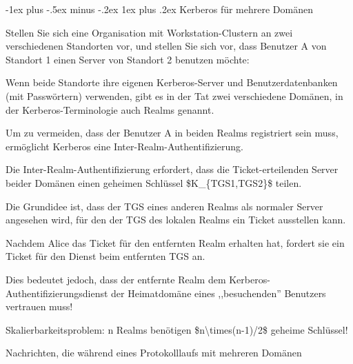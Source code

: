 \documentclass[a4paper]{article}
\makeatletter
\renewcommand{\subsubsection}{\@startsection{subsubsection}{3}{0mm}%
 {-1ex plus -.5ex minus -.2ex}%
 {1ex plus .2ex}%
 {\normalfont\small\bfseries}}
\makeatother
\begin{document}
\begin{multicols}{3}
      \subsubsection{Kerberos für mehrere
            Domänen}

      \begin{itemize*}
            \item Stellen Sie sich eine Organisation mit Workstation-Clustern an zwei
            verschiedenen Standorten vor, und stellen Sie sich vor, dass Benutzer
            A von Standort 1 einen Server von Standort 2 benutzen möchte:
            \begin{itemize*}
                  \item Wenn beide Standorte ihre eigenen Kerberos-Server und Benutzerdatenbanken (mit Passwörtern) verwenden, gibt es in der Tat zwei verschiedene Domänen, in der Kerberos-Terminologie auch Realms genannt.
                  \item Um zu vermeiden, dass der Benutzer A in beiden Realms registriert sein muss, ermöglicht Kerberos eine Inter-Realm-Authentifizierung.
            \end{itemize*}
            \item Die Inter-Realm-Authentifizierung erfordert, dass die
            Ticket-erteilenden Server beider Domänen einen geheimen Schlüssel
            \$K\_\{TGS1,TGS2\}\$ teilen.
            \begin{itemize*}
                  \item Die Grundidee ist, dass der TGS eines anderen Realms als normaler Server angesehen wird, für den der TGS des lokalen Realms ein Ticket ausstellen kann.
                  \item Nachdem Alice das Ticket für den entfernten Realm erhalten hat, fordert sie ein Ticket für den Dienst beim entfernten TGS an.
                  \item Dies bedeutet jedoch, dass der entfernte Realm dem Kerberos-Authentifizierungsdienst der Heimatdomäne eines ,,besuchenden'' Benutzers vertrauen muss!
                  \item Skalierbarkeitsproblem: n Realms benötigen \$n\textbackslash times(n-1)/2\$ geheime Schlüssel!
            \end{itemize*}
            \item Nachrichten, die während eines Protokolllaufs mit mehreren Domänen

\end{itemize*}
\end{multicols}
\end{document}
